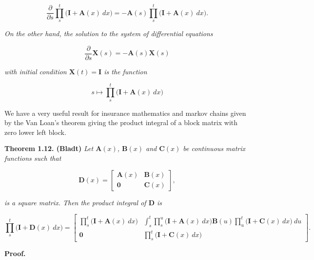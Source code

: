\documentclass[a4paper,12pt,openany]{book}
\begin{document}
\[
\frac{\partial}{\partial s}\prod_{s}^t\big(\mathbf{I}+\mathbf{A}(x)\ dx\big)=-\mathbf{A}(s)\prod_{s}^t\big(\mathbf{I}+\mathbf{A}(x)\ dx\big).
\]

\emph{On the other hand, the solution to the system of differential equations}

\[
\frac{\partial}{\partial s}\mathbf{X}(s)=-\mathbf{A}(s)\mathbf{X}(s)
\]

\emph{with initial condition \(\mathbf{X}(t)=\mathbf{I}\) is the function}

\[
s\mapsto\prod_{s}^t\big(\mathbf{I}+\mathbf{A}(x)\ dx\big)
\]

We have a very useful result for insurance mathematics and markov chains given by the Van Loan's theorem giving the product integral of a block matrix with zero lower left block.

\textbf{Theorem 1.12. (Bladt)} \emph{Let \(\mathbf{A}(x)\), \(\mathbf{B}(x)\) and \(\mathbf{C}(x)\) be continuous matrix functions such that}

\[
\mathbf{D}(x)=\begin{bmatrix}
\mathbf{A}(x) & \mathbf{B}(x)\\
\mathbf{0} & \mathbf{C}(x)
\end{bmatrix},
\]

\emph{is a square matrix. Then the product integral of \(\mathbf{D}\) is}

\[
\prod_{s}^t\big(\mathbf{I}+\mathbf{D}(x)\ dx\big)=
\begin{bmatrix}
\prod_{s}^t\big(\mathbf{I}+\mathbf{A}(x)\ dx\big) & \int_s^t\prod_{s}^u\big(\mathbf{I}+\mathbf{A}(x)\ dx\big)\mathbf{B}(u)\prod_{u}^t\big(\mathbf{I}+\mathbf{C}(x)\ dx\big)\ du\\
\mathbf{0} & \prod_{s}^t\big(\mathbf{I}+\mathbf{C}(x)\ dx\big)
\end{bmatrix}.
\]

\textbf{Proof.}
\end{document}
